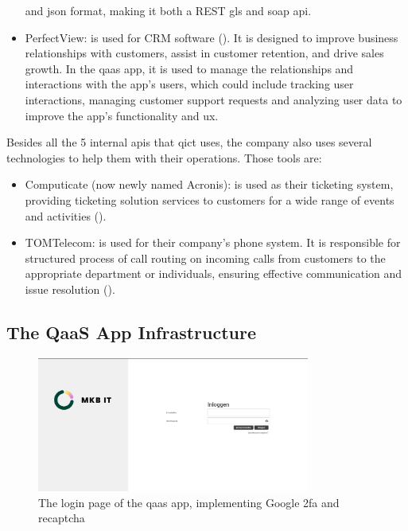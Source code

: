 \begin{itemize}
            and \acrshort{json} format, making it both a \gls{REST gls} and \acrshort{soap} \acrshort{api}.
      \item PerfectView: is used for \gls{CRM} software (\textit{\cite{perfectView}}). It is designed to
            improve business relationships with customers, assist in customer retention, and drive sales growth.
            In the \acrshort{qaas} app, it is used to manage the relationships and interactions with the app's users,
            which could include tracking user interactions, managing customer support requests and analyzing user
            data to improve the app's functionality and \acrshort{ux}.
\end{itemize}

Besides all the 5 internal \acrshort{api}s that \acrshort{qict} uses, the company also uses several technologies to help them with their
operations. Those tools are:

\begin{itemize}
      \item Computicate (now newly named Acronis): is used as their ticketing system, providing ticketing solution services to customers for
            a wide range of events and activities (\textit{\cite{computicate}}).
      \item TOMTelecom: is used for their company's phone system. It is responsible for structured process of call routing on incoming calls
            from customers to the appropriate department or individuals, ensuring effective communication and issue resolution
            (\textit{\cite{tomTelecom}}).
\end{itemize}

\subsection{The QaaS App Infrastructure}

\begin{figure}[htbp]
      \centering
      \includegraphics[width=0.8\textwidth]{Figures/Qaas App/Landing Page.png}
      \caption{The login page of the \acrshort{qaas} app, implementing Google \acrshort{2fa} and re\acrshort{captcha}}
\end{figure}

